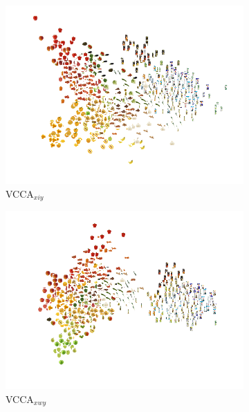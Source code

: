 \begin{figure}[t]
     \begin{subfigure}[b]{0.3\textwidth}
         \centering
         \includegraphics[width=\textwidth]{PaperB/figures_and_tables/latent_space_visualizations/pca_latents_vcca_xiy_seed2.png}
         \caption{VCCA$_{x i y}$}
         \label{fig:pca_vcca_xiy}
     \end{subfigure} 
     \begin{subfigure}[b]{0.3\textwidth}
         \centering
         \includegraphics[width=\textwidth]{PaperB/figures_and_tables/latent_space_visualizations/pca_latents_vcca_xwy_seed2.png}
         \caption{VCCA$_{x w y}$}
         \label{fig:pca_vcca_xwy}
     \end{subfigure} 
     \begin{subfigure}[b]{0.3\textwidth}

\end{subfigure}
\end{figure}
